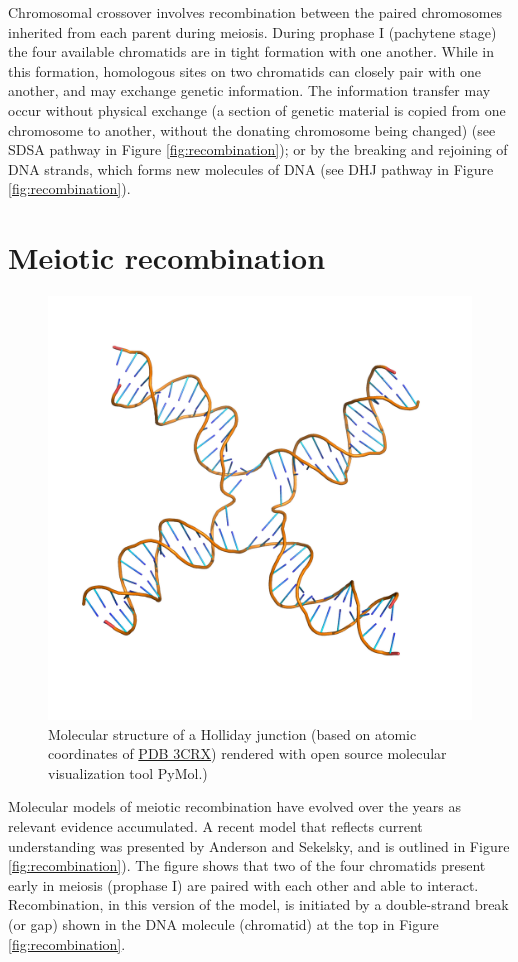 Chromosomal crossover involves recombination between the paired chromosomes inherited from each parent during meiosis. During prophase I (pachytene stage) the four available chromatids are in tight formation with one another. While in this formation, homologous sites on two chromatids can closely pair with one another, and may exchange genetic information. The information transfer may occur without physical exchange (a section of genetic material is copied from one chromosome to another, without the donating chromosome being changed) (see SDSA pathway in Figure \ref{fig:recombination}); or by the breaking and rejoining of DNA strands, which forms new molecules of DNA (see DHJ pathway in Figure \ref{fig:recombination}).

\hypertarget{meiotic-recombination}{%
\section{Meiotic recombination}\label{meiotic-recombination}}



\begin{figure}

{\centering \includegraphics[width=0.7\linewidth]{./figures/linkage/HolidayJunction} 

}

\caption{Molecular structure of a Holliday junction (based on atomic coordinates of \href{https://www.rcsb.org/structure/3crx}{PDB 3CRX}) rendered with open source molecular visualization tool PyMol.)}\label{fig:holliday}
\end{figure}

Molecular models of meiotic recombination have evolved over the years as relevant evidence accumulated. A recent model that reflects current understanding was presented by Anderson and Sekelsky, and is outlined in Figure \ref{fig:recombination}). The figure shows that two of the four chromatids present early in meiosis (prophase I) are paired with each other and able to interact. Recombination, in this version of the model, is initiated by a double-strand break (or gap) shown in the DNA molecule (chromatid) at the top in Figure \ref{fig:recombination}.

